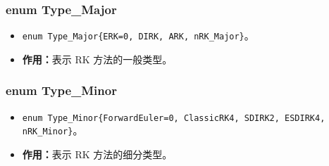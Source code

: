 \documentclass[a4paper,twoside]{ctexart}
\begin{document}
\subsubsection{enum Type\_Major}
\begin{itemize}
    \item \texttt{enum Type\_Major\{ERK=0, DIRK, ARK, nRK\_Major\}}。
    \item \textbf{作用：}表示 RK 方法的一般类型。
\end{itemize}

\subsubsection{enum Type\_Minor}
\begin{itemize}
    \item \texttt{enum Type\_Minor\{ForwardEuler=0, ClassicRK4, SDIRK2, ESDIRK4, nRK\_Minor\}}。
    \item \textbf{作用：}表示 RK 方法的细分类型。
\end{itemize}
\end{document}

